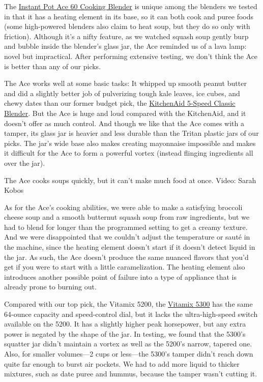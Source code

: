 The
\href{https://www.nytimes3xbfgragh.onion/wirecutter/out/link/28373/147455/4/86231/?merchant=Walmart}{Instant
Pot Ace 60 Cooking Blender} is unique among the blenders we tested in
that it has a heating element in its base, so it can both cook and puree
foods (some high-powered blenders also claim to heat soup, but they do
so only with friction). Although it's a nifty feature, as we watched
squash soup gently burp and bubble inside the blender's glass jar, the
Ace reminded us of a lava lamp: novel but impractical. After performing
extensive testing, we don't think the Ace is better than any of our
picks.

The Ace works well at some basic tasks: It whipped up smooth peanut
butter and did a slightly better job of pulverizing tough kale leaves,
ice cubes, and chewy dates than our former budget pick, the
\href{https://www.nytimes3xbfgragh.onion/wirecutter/out/link/7763/22821/4/109201/?merchant=Amazon}{KitchenAid
5-Speed Classic Blender}. But the Ace is huge and loud compared with the
KitchenAid, and it doesn't offer as much control. And though we like
that the Ace comes with a tamper, its glass jar is heavier and less
durable than the Tritan plastic jars of our picks. The jar's wide base
also makes creating mayonnaise impossible and makes it difficult for the
Ace to form a powerful vortex (instead flinging ingredients all over the
jar).

The Ace cooks soups quickly, but it can't make much food at once. Video:
Sarah Kobos

As for the Ace's cooking abilities, we were able to make a satisfying
broccoli cheese soup and a smooth butternut squash soup from raw
ingredients, but we had to blend for longer than the programmed setting
to get a creamy texture. And we were disappointed that we couldn't
adjust the temperature or sauté in the machine, since the heating
element doesn't start if it doesn't detect liquid in the jar. As such,
the Ace doesn't produce the same nuanced flavors that you'd get if you
were to start with a little caramelization. The heating element also
introduces another possible point of failure into a type of appliance
that is already prone to burning out.

Compared with our top pick, the Vitamix 5200, the
\href{https://www.nytimes3xbfgragh.onion/wirecutter/out/link/29475/149476/4/83450/?merchant=Amazon}{Vitamix
5300} has the same 64-ounce capacity and speed-control dial, but it
lacks the ultra-high-speed switch available on the 5200. It has a
slightly higher peak horsepower, but any extra power is negated by the
shape of the jar. In testing, we found that the 5300's squatter jar
didn't maintain a vortex as well as the 5200's narrow, tapered one.
Also, for smaller volumes---2 cups or less---the 5300's tamper didn't
reach down quite far enough to burst air pockets. We had to add more
liquid to thicker mixtures, such as date puree and hummus, because the
tamper wasn't cutting it.

